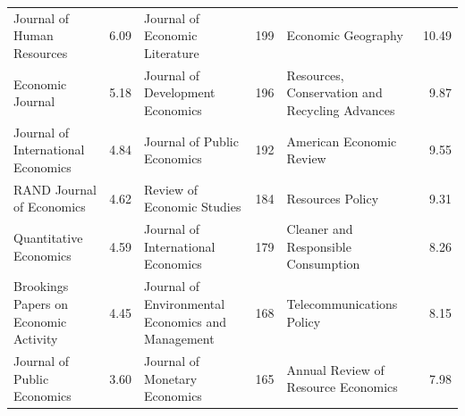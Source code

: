\begin{table}[p]
\begin{tabularx}{\hsize}{@{}Yr|Yr|Yr@{}}
Journal of Human Resources & 6.09 & Journal of Economic Literature & 199 & Economic Geography & 10.49 \\
Economic Journal & 5.18 & Journal of Development Economics & 196 & Resources, Conservation and Recycling Advances & 9.87 \\
Journal of International Economics & 4.84 & Journal of Public Economics & 192 & American Economic Review & 9.55 \\
RAND Journal of Economics & 4.62 & Review of Economic Studies & 184 & Resources Policy & 9.31 \\
Quantitative Economics & 4.59 & Journal of International Economics & 179 & Cleaner and Responsible Consumption & 8.26 \\
Brookings Papers on Economic Activity & 4.45 & Journal of Environmental Economics and Management & 168 & Telecommunications Policy & 8.15 \\
Journal of Public Economics & 3.60 & Journal of Monetary Economics & 165 & Annual Review of Resource Economics & 7.98 \\
\bottomrule
\end{tabularx}
\end{table}
